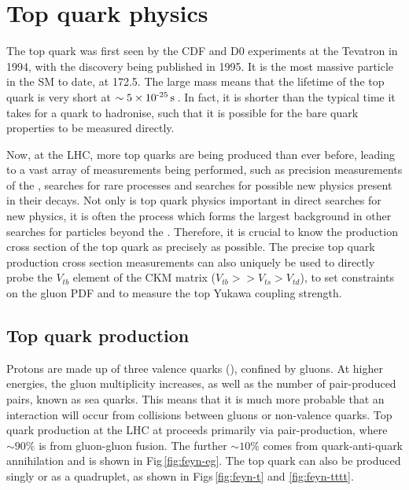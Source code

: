 \section{Top quark physics} %
\label{sec:top_quark_physics}

The top quark was first seen by the CDF and D0 experiments at the Tevatron in 1994, with the discovery being published in 1995.
It is the most massive particle in the SM to date, at 172.5\GeV{}.
The large mass means that the lifetime of the top quark is very short at $\sim5\times \text{10}^\text{-25}\,\text{s}$\,\cite{PDG}.
In fact, it is shorter than the typical time it takes for a quark to hadronise, such that it is possible for the bare quark properties to be measured directly.

Now, at the LHC, more top quarks are being produced than ever before, leading to a vast array of measurements being performed, such as precision measurements of the \SM{}, searches for rare \SM{} processes and searches for possible new physics present in their decays.
Not only is top quark physics important in direct searches for new physics, it is often the process which forms the largest background in other searches for particles beyond the \SM{}.
Therefore, it is crucial to know the production cross section of the top quark as precisely as possible.
The precise top quark production cross section measurements can also uniquely be used to directly probe the $V_{tb}$ element of the CKM matrix ($V_{tb} >> V_{ts} > V_{td}$), to set constraints on the gluon PDF and to measure the top Yukawa coupling strength.


\subsection{Top quark production} %
\label{sub:top_quark_production}

Protons are made up of three valence quarks (\uquark{}\uquark{}\dquark{}), confined by gluons. 
At higher energies, the gluon multiplicity increases, as well as the number of pair-produced \qqbar{} pairs, known as sea quarks.
This means that it is much more probable that an interaction will occur from collisions between gluons or non-valence quarks.
Top quark production at the LHC at \com{} proceeds primarily via \ttbar{} pair-production, where $\sim90\%$ is from gluon-gluon fusion. 
The further $\sim10\%$ comes from quark-anti-quark annihilation and is shown in Fig\,\ref{fig:feyn-eg}. 
The top quark can also be produced singly or as a quadruplet, as shown in Figs\,\ref{fig:feyn-t} and \ref{fig:feyn-tttt}.



